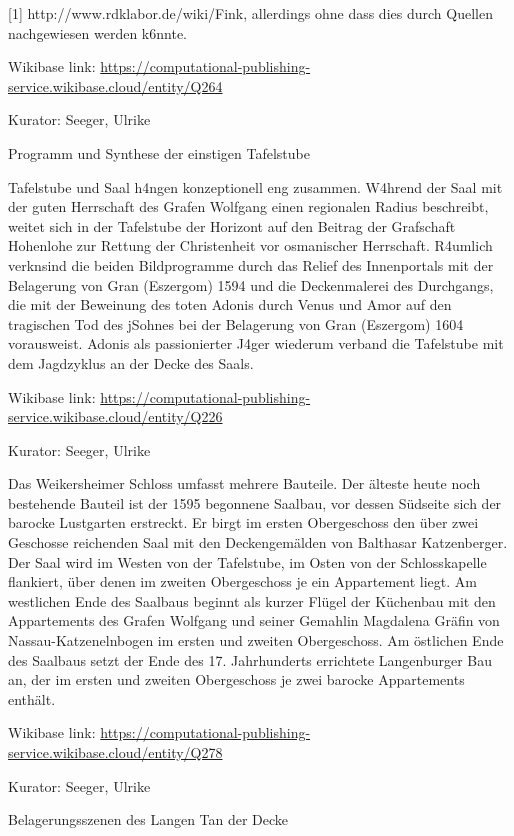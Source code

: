 \documentclass[
  letterpaper,
]{book}
\begin{document}
{[}1{]} http://www.rdklabor.de/wiki/Fink, allerdings ohne dass dies
durch Quellen nachgewiesen werden k\xb6nnte.

Wikibase link:
\url{https://computational-publishing-service.wikibase.cloud/entity/Q264}

Kurator: Seeger, Ulrike

Programm und Synthese der einstigen Tafelstube

Tafelstube und Saal h\xa4ngen konzeptionell eng zusammen.
W\xa4hrend der Saal mit der guten Herrschaft des Grafen Wolfgang
einen regionalen Radius beschreibt, weitet sich in der Tafelstube der
Horizont auf den Beitrag der Grafschaft Hohenlohe zur Rettung der
Christenheit vor osmanischer Herrschaft. R\xa4umlich
verkn\xbcpft sind die beiden Bildprogramme durch das Relief des
Innenportals mit der Belagerung von Gran (Eszergom) 1594 und die
Deckenmalerei des Durchgangs, die mit der Beweinung des toten Adonis
durch Venus und Amor auf den tragischen Tod des j\xbcngsten Sohnes
bei der Belagerung von Gran (Eszergom) 1604 vorausweist. Adonis als
passionierter J\xa4ger wiederum verband die Tafelstube mit dem
Jagdzyklus an der Decke des Saals.

Wikibase link:
\url{https://computational-publishing-service.wikibase.cloud/entity/Q226}

Kurator: Seeger, Ulrike

Das Weikersheimer Schloss umfasst mehrere Bauteile. Der älteste heute
noch bestehende Bauteil ist der 1595 begonnene Saalbau, vor dessen
Südseite sich der barocke Lustgarten erstreckt. Er birgt im ersten
Obergeschoss den über zwei Geschosse reichenden Saal mit den
Deckengemälden von Balthasar Katzenberger. Der Saal wird im Westen von
der Tafelstube, im Osten von der Schlosskapelle flankiert, über denen im
zweiten Obergeschoss je ein Appartement liegt. Am westlichen Ende des
Saalbaus beginnt als kurzer Flügel der Küchenbau mit den Appartements
des Grafen Wolfgang und seiner Gemahlin Magdalena Gräfin von
Nassau-Katzenelnbogen im ersten und zweiten Obergeschoss. Am östlichen
Ende des Saalbaus setzt der Ende des 17. Jahrhunderts errichtete
Langenburger Bau an, der im ersten und zweiten Obergeschoss je zwei
barocke Appartements enthält.

Wikibase link:
\url{https://computational-publishing-service.wikibase.cloud/entity/Q278}

Kurator: Seeger, Ulrike

Belagerungsszenen des Langen T\xbcrkenkriegs an der Decke
\end{document}
